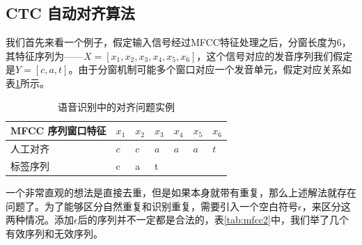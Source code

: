\documentclass[twoside,a4paper,12pt]{book}%
\begin{document}
\subsection{CTC 自动对齐算法}
我们首先来看一个例子，假定输入信号经过MFCC特征处理之后，分窗长度为6，其特征序列为——$X=[x_1,x_2,x_3,x_4,x_5,x_6]$，这个信号对应的发音序列我们假定是$Y=[c,a,t]$。由于分窗机制可能多个窗口对应一个发音单元，假定对应关系如表\ref{tab:mfcc1}所示。
\begin{table} [h]
	\begin{center}
		\begin{tabular}{lllllll}
			\hline    
			MFCC 序列窗口特征&$x_1$&$x_2$&$x_3$&$x_4$&$x_5$&$x_6$\\
			\hline    
			人工对齐&$c$&$c$&$a$&$a$&$a$&$t$ \\
			\hline
			标签序列&c&a&t&&&\\
			\hline
		\end{tabular}
		\caption{语音识别中的对齐问题实例}  \label{tab:mfcc1}
	\end{center}
\end{table}  
一个非常直观的想法是直接去重，但是如果本身就带有重复，那么上述解法就存在问题了。为了能够区分自然重复和识别重复，需要引入一个空白符号$\epsilon$，来区分这两种情况。添加$\epsilon$后的序列并不一定都是合法的，表\ref{tab:mfcc2}中，我们举了几个有效序列和无效序列。
\end{document}
